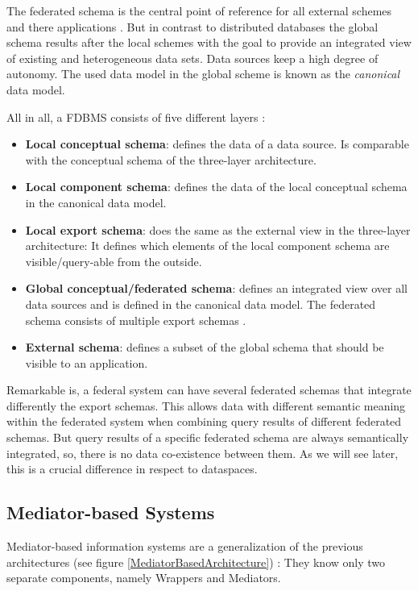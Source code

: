 The federated schema is the central point of reference for all external schemes and there applications \cite[p. 94]{DBLP:books/dp/LeserN2006}. But in contrast to distributed databases the global schema results after the local schemes with the goal to provide an integrated view of existing and heterogeneous data sets. Data sources keep a high degree of autonomy. The used data model in the global scheme is known as the \emph{canonical} data model. 

All in all, a FDBMS consists of five different layers \cite[p. 95]{DBLP:books/dp/LeserN2006}:

\begin{itemize}
\item \textbf{Local conceptual schema}: defines the data of a data source. Is comparable with the conceptual schema of the three-layer architecture.
\item \textbf{Local component schema}: defines the data of the local conceptual schema in the canonical data model. 
\item \textbf{Local export schema}: does the same as the external view in the three-layer architecture: It defines which elements of the local component schema are visible/query-able from the outside.
\item \textbf{Global conceptual/federated schema}: defines an integrated view over all data sources and is defined in the canonical data model. The federated schema consists of multiple export schemas \cite[p. 200]{Sheth:1990:FDS:96602.96604}.
\item \textbf{External schema}: defines a subset of the global schema that should be visible to an application.
\end{itemize}

Remarkable is, a federal system can have several federated schemas that integrate differently the export schemas. This allows data with different semantic meaning within the federated system when combining query results of different federated schemas. But query results of a specific federated schema are always semantically integrated, so, there is no data co-existence between them. As we will see later, this is a crucial difference in respect to dataspaces.

\subsection{Mediator-based Systems}

Mediator-based information systems are a generalization of the previous architectures (see figure \ref{MediatorBasedArchitecture}) \cite[p. 97]{DBLP:books/dp/LeserN2006}: They know only two separate components, namely Wrappers and Mediators. 

